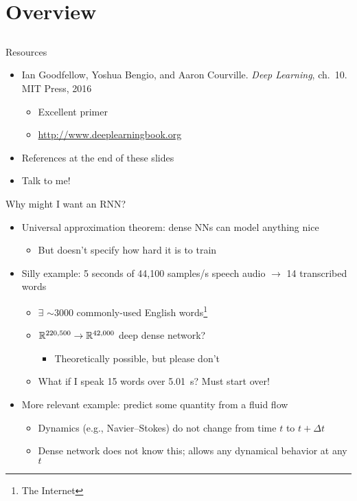 \section{Overview}
\subsection{}

\begin{frame}{Resources}
    \begin{itemize}
        \item Ian Goodfellow, Yoshua Bengio, and Aaron Courville.
        \emph{Deep Learning}, ch.~10. MIT Press, 2016
        \nocite{GoodfellowDL}
        \begin{itemize}
            \item Excellent primer
            \item \textcolor{blue}{\url{http://www.deeplearningbook.org}}
        \end{itemize}
        \item References at the end of these slides
        \item Talk to me! \smiley
    \end{itemize}
\end{frame}

\begin{frame}{Why might I want an RNN?}
    \begin{itemize}
        \item<+-> Universal approximation theorem: dense NNs can model anything nice
        \begin{itemize}
            \item But doesn't specify how hard it is to train
        \end{itemize}
        \item<+-> Silly example: 5 seconds of 44,100 samples/s speech audio $\rightarrow$ 14 transcribed words
        \begin{itemize}
            \item $\exists$ $\sim$3000 commonly-used English words\footnote{The Internet}
            \item $\mathbb{R}^{220,500} \to \mathbb{R}^{42,000}$ deep dense network?
            \begin{itemize}
                \item Theoretically possible, but please don't
            \end{itemize}
            \item What if I speak 15 words over 5.01~s?
            Must start over!
        \end{itemize}
        \item<+-> More relevant example: predict some quantity from a fluid flow
        \begin{itemize}
            \item Dynamics (e.g., Navier--Stokes) do not change from time $t$ to $t + \Delta t$
            \item Dense network does not know this; allows any dynamical behavior at any $t$
        \end{itemize}
    \end{itemize}
\end{frame}

